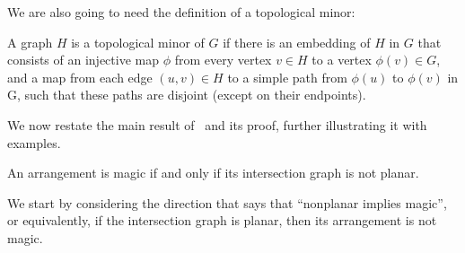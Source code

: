 \documentclass{llncs}
\begin{document}
We are also going to need the definition of a topological minor:

\begin{definition}\label{def:topo}
  A graph \(H\) is a topological minor of \(G\) if there is an
  embedding of \(H\) in \(G\) that consists of an injective map
  \(\phi\) from every vertex \(v \in H\) to a vertex
  \(\phi(v) \in G\), and a map from each edge \((u, v) \in H\) to a
  simple path from \(\phi(u)\) to \(\phi(v)\) in G, such that these
  paths are disjoint (except on their endpoints).
\end{definition}

We now restate the main result of~\cite{arkhipov2012} and its proof,
further illustrating it with examples.

\begin{theorem}\label{theo:main}
  An arrangement is magic if and only if its intersection graph is not
  planar.
\end{theorem}

We start by considering the direction that says that ``nonplanar
implies magic'', or equivalently, if the intersection graph is planar,
then its arrangement is not magic.
\end{document}
